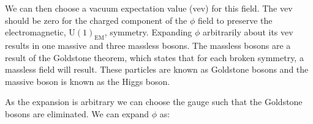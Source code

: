 

We can then choose a vacuum expectation value (vev) for this field. The vev should be zero for the charged component of the $\phi$ field to preserve the electromagnetic, $\mathrm{U(1)_{EM}}$, symmetry. Expanding $\phi$ arbitrarily about its vev results in one massive and three massless bosons. The massless bosons are a result of the Goldstone theorem, which states that for each broken symmetry, a massless field will result. These particles are known as Goldstone bosons and the massive boson is known as the Higgs boson.

As the expansion is arbitrary we can choose the gauge such that the Goldstone bosons are eliminated. We can expand $\phi$ as:









	
